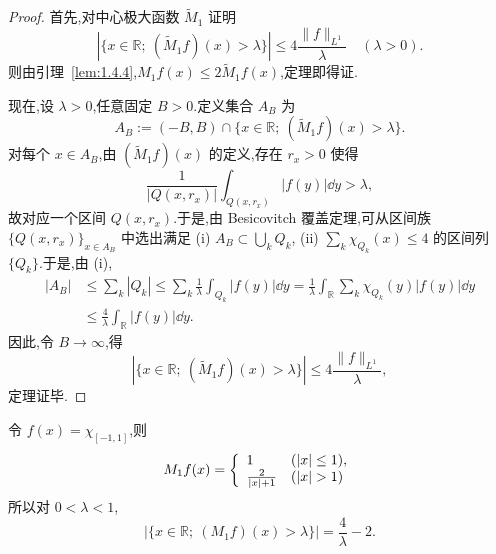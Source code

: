 \begin{proof}
首先,对中心极大函数 $\tilde{M}_{1}$ 证明
\begin{equation*}
|\{x \in \mathbb{R};\ (\tilde{M}_{1}f)(x) > \lambda\}| \leq 4\frac{\| f \|_{L^{1}}}{\lambda} \quad (\lambda > 0).
\end{equation*}
则由引理~\ref{lem:1.4.4},$M_{1}f(x) \leq 2\tilde{M}_{1}f(x)$,定理即得证.

现在,设 $\lambda > 0$,任意固定 $B > 0$.定义集合 $A_{B}$ 为
\begin{equation*}
A_{B} := (-B, B) \cap \{x \in \mathbb{R};\ (\tilde{M}_{1}f)(x) > \lambda\}.
\end{equation*}
对每个 $x \in A_{B}$,由 $(\tilde{M}_{1}f)(x)$ 的定义,存在 $r_{x} > 0$ 使得
\begin{equation*}
\frac{1}{|Q(x, r_{x})|}\int_{Q(x, r_{x})}|f(y)|\dd y > \lambda,
\end{equation*}
故对应一个区间 $Q(x, r_{x})$.于是,由 Besicovitch 覆盖定理,可从区间族 $\{Q(x, r_{x})\}_{x \in A_{B}}$ 中选出满足
(i) $A_{B} \subset \bigcup_{k}Q_{k}$,
(ii) $\sum_{k}\chi_{Q_{k}}(x) \leq 4$
的区间列 $\{Q_{k}\}$.于是,由 (i),
\begin{align*}
|A_{B}| &\leq \sum_{k}|Q_{k}| \leq \sum_{k}\frac{1}{\lambda}\int_{Q_{k}}|f(y)|\dd y = \frac{1}{\lambda}\int_{\mathbb{R}}\sum_{k}\chi_{Q_{k}}(y)|f(y)|\dd y \\
&\leq \frac{4}{\lambda}\int_{\mathbb{R}}|f(y)|\dd y.
\end{align*}
因此,令 $B \to \infty$,得
\begin{equation*}
|\{x \in \mathbb{R};\ (\tilde{M}_{1}f)(x) > \lambda\}| \leq 4\frac{\| f \|_{L^{1}}}{\lambda},
\end{equation*}
定理证毕.
\end{proof}

\begin{note}\label{note:1.5.3}
令 $f(x) = \chi_{[-1,1]}$,则
\begin{equation*}
M_{1}f(x) = \left\{ \begin{array}{l l}
1 & (|x| \leq 1), \\
\frac{2}{|x| + 1} & (|x| > 1)
\end{array} \right.
\end{equation*}
所以对 $0 < \lambda < 1$,
\begin{equation*}
|\{x \in \mathbb{R};\ (M_{1}f)(x) > \lambda\}| = \frac{4}{\lambda} - 2.
\end{equation*}
\end{note}

